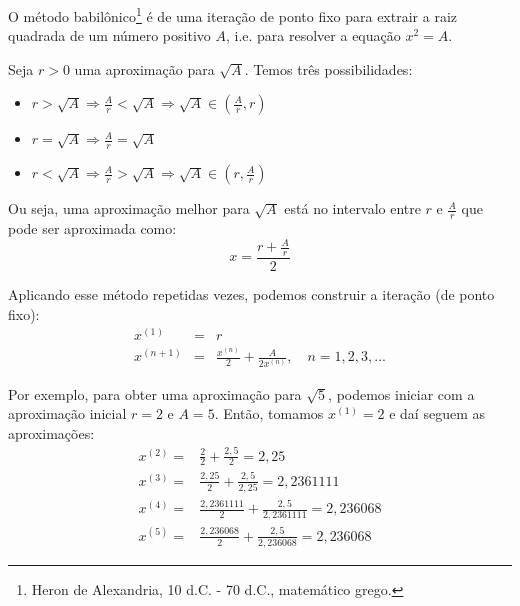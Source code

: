 \begin{ex}
O método babilônico\footnote{Heron de Alexandria, 10 d.C. - 70 d.C., matemático grego.} é de uma iteração de ponto fixo para extrair a raiz quadrada de um número positivo $A$, i.e. para resolver a equação $x^2 = A$.

Seja $r>0$ uma aproximação para $\sqrt{A}$. Temos três possibilidades:
\begin{itemize}
\item $r>\sqrt{A} \Longrightarrow \frac{A}{r}<\sqrt{A} \Longrightarrow \sqrt{A}\in \left(\frac{A}{r}, r\right)$
\item $r=\sqrt{A} \Longrightarrow \frac{A}{r}=\sqrt{A}$
\item $r<\sqrt{A} \Longrightarrow \frac{A}{r}>\sqrt{A} \Longrightarrow \sqrt{A}\in \left(r, \frac{A}{r}\right)$
\end{itemize}
Ou seja, uma aproximação melhor para $\sqrt{A}$ está no intervalo entre $r$ e $\frac{A}{r}$ que pode ser aproximada como:
$$x=\frac{r+\frac{A}{r}}{2}$$

Aplicando esse método repetidas vezes, podemos construir a iteração (de ponto fixo):
\begin{eqnarray*}
x^{(1)}&=&r \\
x^{(n+1)}&=&\frac{x^{(n)}}{2}+\frac{A}{2x^{(n)}}, \quad n=1,2,3,...
\end{eqnarray*}

Por exemplo, para obter uma aproximação para $\sqrt{5}$, podemos iniciar com a aproximação inicial $r=2$ e $A=5$. Então, tomamos $x^{(1)} = 2$ e daí seguem as aproximações:
\begin{align*}
x^{(2)}=&\frac{2}{2}+\frac{2,5}{2} = 2,25\\
x^{(3)}=&\frac{2,25}{2}+\frac{2,5}{2,25}= 2,2361111  \\
x^{(4)}=&\frac{2,2361111}{2}+\frac{2,5}{2,2361111}= 2,236068  \\
x^{(5)}=&\frac{2,236068}{2}+\frac{2,5}{2,236068}= 2,236068
\end{align*}
\end{ex}  


